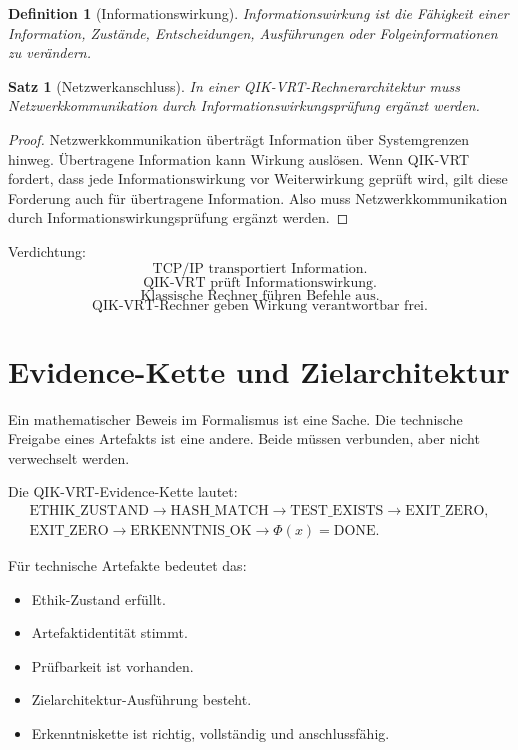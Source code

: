 \documentclass[11pt,a4paper,oneside]{scrartcl}
\theoremstyle{qikstyle}
\newtheorem{definition}{Definition}[section]
\newtheorem{satz}{Satz}[section]
\newcommand{\DONE}{\mathrm{DONE}}
\newcommand{\HASH}{\mathrm{HASH\_MATCH}}
\newcommand{\TEST}{\mathrm{TEST\_EXISTS}}
\newcommand{\EXIT}{\mathrm{EXIT\_ZERO}}
\newcommand{\ERK}{\mathrm{ERKENNTNIS\_OK}}
\newcommand{\ETH}{\mathrm{ETHIK\_ZUSTAND}}
\newcommand{\Phiop}{\Phi}
\begin{document}
\begin{definition}[Informationswirkung]
Informationswirkung ist die Fähigkeit einer Information, Zustände, Entscheidungen, Ausführungen oder Folgeinformationen zu verändern.
\end{definition}

\begin{satz}[Netzwerkanschluss]
In einer QIK-VRT-Rechnerarchitektur muss Netzwerkkommunikation durch Informationswirkungsprüfung ergänzt werden.
\end{satz}

\begin{proof}
Netzwerkkommunikation überträgt Information über Systemgrenzen hinweg. Übertragene Information kann Wirkung auslösen. Wenn QIK-VRT fordert, dass jede Informationswirkung vor Weiterwirkung geprüft wird, gilt diese Forderung auch für übertragene Information. Also muss Netzwerkkommunikation durch Informationswirkungsprüfung ergänzt werden.
\end{proof}

Verdichtung:
\[
\text{TCP/IP transportiert Information.}
\]
\[
\text{QIK-VRT prüft Informationswirkung.}
\]
\[
\text{Klassische Rechner führen Befehle aus.}
\]
\[
\text{QIK-VRT-Rechner geben Wirkung verantwortbar frei.}
\]
\newpage

\section{Evidence-Kette und Zielarchitektur}

Ein mathematischer Beweis im Formalismus ist eine Sache. Die technische Freigabe eines Artefakts ist eine andere. Beide müssen verbunden, aber nicht verwechselt werden.

Die QIK-VRT-Evidence-Kette lautet:
\[
\begin{gathered}
\ETH \to \HASH \to \TEST \to \EXIT,\\
\EXIT \to \ERK \to \Phiop(x)=\DONE.
\end{gathered}
\]

Für technische Artefakte bedeutet das:
\begin{itemize}
\item Ethik-Zustand erfüllt.
\item Artefaktidentität stimmt.
\item Prüfbarkeit ist vorhanden.
\item Zielarchitektur-Ausführung besteht.
\item Erkenntniskette ist richtig, vollständig und anschlussfähig.
\end{itemize}
\end{document}
